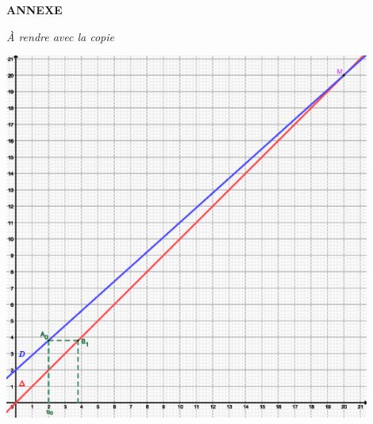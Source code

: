 \newpage
\begin{center}
     \textbf{ANNEXE}
\end{center}
\begin{center}
     \emph{\`A rendre avec la copie}
\end{center}

\begin{center}
\end{center}
\begin{center}
     \begin{extern}%
          \includegraphics[width=0.9\textwidth]{images/BBESL-s3-2-1.eps}%
     \end{extern}
\end{center}

